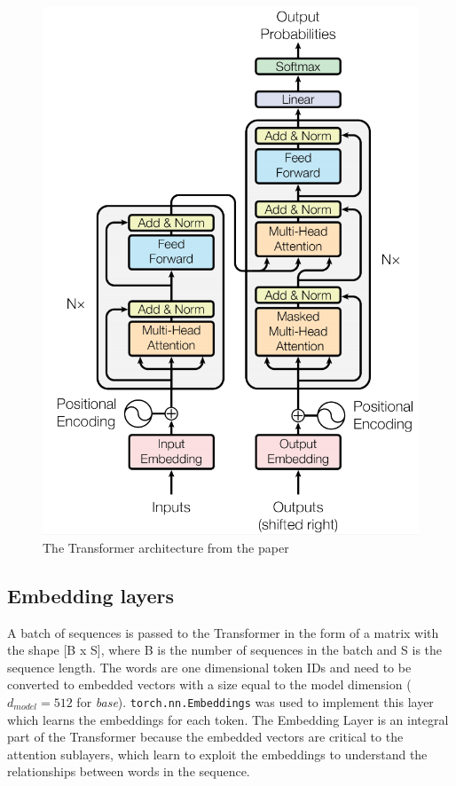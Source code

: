 \documentclass[12pt,a4paper,twoside,openright]{report}
\begin{document}
\begin{figure}
    \centering
    \includegraphics[width=\textwidth/2]{figs/transformer-architecture.PNG}
    \caption{The Transformer architecture from the paper \cite{transformers}}
    \label{fig:transformer-architecture}
\end{figure}

\subsection{Embedding layers}
\label{embedding-layers}

A batch of sequences is passed to the Transformer in the form of a matrix with the shape [B x S], where B is the number of sequences in the batch and S is the sequence length. The words are one dimensional token IDs and need to be converted to embedded vectors with a size equal to the model dimension ($d_{model} = 512$ for \textit{base}). \lstinline{torch.nn.Embeddings} was used to implement this layer which learns the embeddings for each token. The Embedding Layer is an integral part of the Transformer because the embedded vectors are critical to the attention sublayers, which learn to exploit the embeddings to understand the relationships between words in the sequence. 
\end{document}

